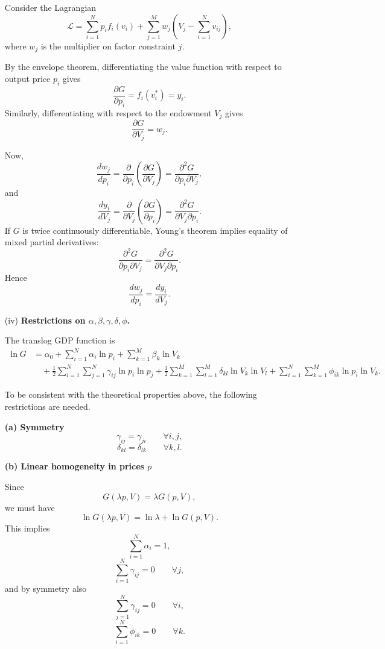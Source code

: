 \begin{enumerate}
Consider the Lagrangian
\[
\mathcal{L}
=
\sum_{i=1}^N p_i f_i(v_i)
+
\sum_{j=1}^M w_j
\left(
V_j-\sum_{i=1}^N v_{ij}
\right),
\]
where $w_j$ is the multiplier on factor constraint $j$.

By the envelope theorem, differentiating the value function with respect to output price $p_i$ gives
\[
\frac{\partial G}{\partial p_i}
=
f_i(v_i^*)
=
y_i.
\]
Similarly, differentiating with respect to the endowment $V_j$ gives
\[
\frac{\partial G}{\partial V_j}
=
w_j.
\]

Now,
\[
\frac{d w_j}{d p_i}
=
\frac{\partial}{\partial p_i}\left(\frac{\partial G}{\partial V_j}\right)
=
\frac{\partial^2 G}{\partial p_i \partial V_j},
\]
and
\[
\frac{d y_i}{d V_j}
=
\frac{\partial}{\partial V_j}\left(\frac{\partial G}{\partial p_i}\right)
=
\frac{\partial^2 G}{\partial V_j \partial p_i}.
\]
If $G$ is twice continuously differentiable, Young's theorem implies equality of mixed partial derivatives:
\[
\frac{\partial^2 G}{\partial p_i \partial V_j}
=
\frac{\partial^2 G}{\partial V_j \partial p_i}.
\]
Hence
\[
\frac{d w_j}{d p_i}=\frac{d y_i}{d V_j}.
\]

\bigskip

\item[(iv)] \textbf{Restrictions on $\alpha,\beta,\gamma,\delta,\phi$.}

The translog GDP function is
\[
\begin{aligned}
\ln G
&=
\alpha_0
+ \sum_{i=1}^N \alpha_i \ln p_i
+ \sum_{k=1}^M \beta_k \ln V_k \\
&\quad
+ \frac12 \sum_{i=1}^N \sum_{j=1}^N \gamma_{ij}\ln p_i \ln p_j
+ \frac12 \sum_{k=1}^M \sum_{l=1}^M \delta_{kl}\ln V_k \ln V_l
+ \sum_{i=1}^N \sum_{k=1}^M \phi_{ik}\ln p_i \ln V_k.
\end{aligned}
\]

To be consistent with the theoretical properties above, the following restrictions are needed.

\medskip

\textbf{(a) Symmetry}
\[
\gamma_{ij}=\gamma_{ji}
\qquad
\forall i,j,
\]
\[
\delta_{kl}=\delta_{lk}
\qquad
\forall k,l.
\]

\medskip

\textbf{(b) Linear homogeneity in prices $p$}

Since
\[
G(\lambda p,V)=\lambda G(p,V),
\]
we must have
\[
\ln G(\lambda p,V)=\ln \lambda+\ln G(p,V).
\]
This implies
\[
\sum_{i=1}^N \alpha_i = 1,
\]
\[
\sum_{i=1}^N \gamma_{ij}=0
\qquad
\forall j,
\]
and by symmetry also
\[
\sum_{j=1}^N \gamma_{ij}=0
\qquad
\forall i,
\]
\[
\sum_{i=1}^N \phi_{ik}=0
\qquad
\forall k.
\]


\end{enumerate}
